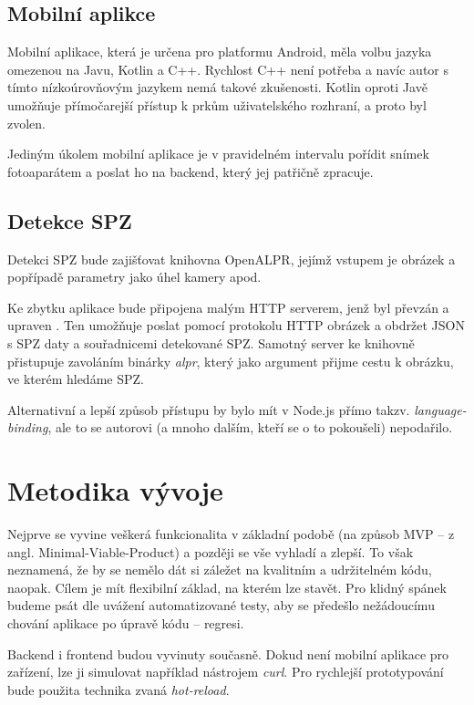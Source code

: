 \subsection{Mobilní aplikce} \label{mobile_app}

Mobilní aplikace, která je určena pro platformu Android, měla volbu jazyka omezenou na Javu, Kotlin a C++.
Rychlost C++ není potřeba a navíc autor s tímto nízkoúrovňovým jazykem nemá takové zkušenosti.
Kotlin oproti Javě umožňuje přímočarejší přístup k prkům uživatelského rozhraní, a proto byl zvolen.

Jediným úkolem mobilní aplikace je v pravidelném intervalu pořídit snímek fotoaparátem a poslat ho na
backend, který jej patřičně zpracuje.

\subsection{Detekce SPZ}

Detekci SPZ bude zajišťovat knihovna OpenALPR, jejímž vstupem je obrázek a popřípadě
parametry jako úhel kamery apod.
\citep[viz][]{OpenALPR}

Ke zbytku aplikace bude připojena malým HTTP serverem, jenž byl převzán a upraven
\citep[viz][]{OpenALPR_Server}.
Ten umožňuje poslat pomocí protokolu HTTP obrázek a obdržet JSON s SPZ daty a souřadnicemi detekované SPZ.
Samotný server ke knihovně přistupuje zavoláním binárky \textit{alpr}, který jako argument přijme cestu k
obrázku, ve kterém hledáme SPZ.

Alternativní a lepší způsob přístupu by bylo mít v Node.js přímo takzv.
\textit{language-binding}, ale to se autorovi (a mnoho dalším, kteří se o to pokoušeli) nepodařilo.

\section{Metodika vývoje}

Nejprve se vyvine veškerá funkcionalita v základní podobě
(na způsob MVP -- z angl. Minimal-Viable-Product) a později se vše vyhladí a zlepší. To však neznamená,
že by se nemělo dát si záležet na kvalitním a udržitelném kódu, naopak. Cílem je mít flexibilní základ,
na kterém lze stavět. Pro klidný spánek budeme psát dle uvážení automatizované testy, aby se předešlo
nežádoucímu chování aplikace po úpravě kódu -- regresi.

Backend i frontend budou vyvinuty současně. Dokud není mobilní aplikace pro zařízení, lze ji simulovat
například nástrojem \textit{curl}. Pro rychlejší prototypování bude použita technika zvaná
\textit{hot-reload}.
